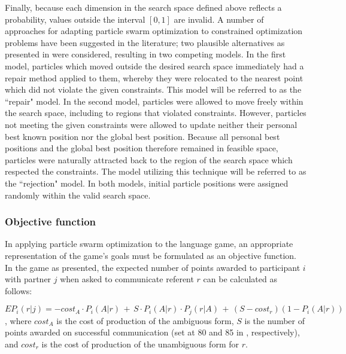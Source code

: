 \documentclass[12pt,a4paper]{article}
\begin{document}
Finally, because each dimension in the search space defined above reflects a probability, values outside the interval $[0, 1]$ are invalid. A number of approaches for adapting particle swarm optimization to constrained optimization problems have been suggested in the literature; two plausible alternatives as presented in \cite{engelbrecht2005} were considered, resulting in two competing models. 
In the first model, particles which moved outside the desired search space immediately had a repair method applied to them, whereby they were relocated to the nearest point which did not violate the given constraints. This model will be referred to as the ``repair" model. In the second model, particles were allowed to move freely within the search space, including to regions that violated constraints. However, particles not meeting the given constraints were allowed to update neither their personal best known position nor the global best position. Because all personal best positions and the global best position therefore remained in feasible space, particles were naturally attracted back to the region of the search space which respected the constraints. The model utilizing this technique will be referred to as the ``rejection" model. In both models, initial particle positions were assigned randomly within the valid search space.


 
\subsubsection{Objective function}
In applying particle swarm optimization to the \citeauthor{rohde2012} language game, an appropriate representation of the game's goals must be formulated as an objective function. In the game as presented, the expected number of points awarded to participant $i$ with partner $j$ when asked to communicate referent $r$ can be calculated as follows:


\[
EP_{i}(r|j) = -cost_A \cdot P_i(A|r) \,+\,S \cdot P_i(A|r) \cdot P_j(r|A) \,+\,(S - cost_r) (1 - P_i(A|r))
\],
where $cost_A$ is the cost of production of the ambiguous form, $S$ is the number of points awarded on successful communication (set at 80 and 85 in \citeauthor{rohde2012}, respectively), and $cost_r$ is the cost of production of the unambiguous form for $r$.
\end{document}
